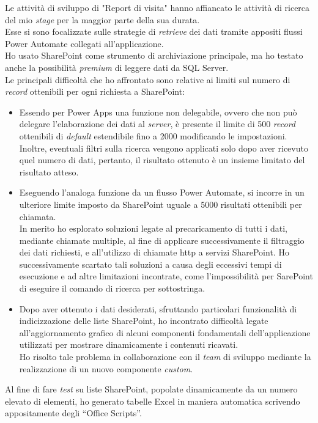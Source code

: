 \noindent Le attività di sviluppo di "Report di visita" hanno affiancato le attività di ricerca del mio \emph{stage} per la maggior parte della sua durata.\\
Esse si sono focalizzate sulle strategie di \emph{retrieve} dei dati tramite appositi flussi Power Automate collegati all'applicazione.\\
Ho usato SharePoint come strumento di archiviazione principale, ma ho testato anche la possibilità \emph{premium} di leggere dati da SQL Server.\\
Le principali difficoltà che ho affrontato sono relative ai limiti sul numero di \emph{record} ottenibili per ogni richiesta a SharePoint:
\begin{itemize}
    \item Essendo per Power Apps una funzione non delegabile, ovvero che non può delegare l'elaborazione dei dati al \emph{server}, è presente il limite di 500 \emph{record} ottenibili di \emph{default} estendibile fino a 2000 modificando le impostazioni.
    Inoltre, eventuali filtri sulla ricerca vengono applicati solo dopo aver ricevuto quel numero di dati, pertanto, il risultato ottenuto è un insieme limitato del risultato atteso.
    \item Eseguendo l'analoga funzione da un flusso Power Automate, si incorre in un ulteriore limite imposto da SharePoint uguale a 5000 risultati ottenibili per chiamata.\\
    In merito ho esplorato soluzioni legate al precaricamento di tutti i dati, mediante chiamate multiple, al fine di applicare successivamente il filtraggio dei dati richiesti, e all'utilizzo di chiamate \gls{http} a servizi SharePoint.
    Ho successivamente scartato tali soluzioni a causa degli eccessivi tempi di esecuzione e ad altre limitazioni incontrate, come l'impossibilità per SarePoint di eseguire il comando di ricerca per sottostringa.
    \item Dopo aver ottenuto i dati desiderati, sfruttando particolari funzionalità di indicizzazione delle liste SharePoint, ho incontrato difficoltà legate all'aggiornamento grafico di alcuni componenti fondamentali dell'applicazione utilizzati per mostrare dinamicamente i contenuti ricavati.\\
    Ho risolto tale problema in collaborazione con il \emph{team} di sviluppo mediante la realizzazione di un nuovo componente \emph{custom}.  
\end{itemize}
Al fine di fare \emph{test} su liste SharePoint, popolate dinamicamente da un numero elevato di elementi, ho generato tabelle Excel in maniera automatica scrivendo appositamente degli “Office Scripts”.

